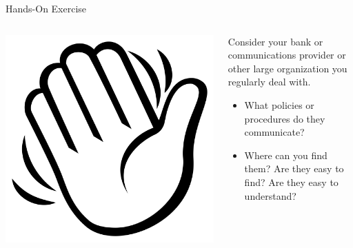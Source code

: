\documentclass[ignorenonframetext,xcolor=x11names]{beamer}
\begin{document}
\begin{frame}{Hands-On Exercise}
\begin{columns}
\begin{column}{0.2\textwidth}
\href{https://commons.wikimedia.org/wiki/File:Emojione_BW_1F44B.svg}{\includegraphics[width=\textwidth]{hand.png}}
\end{column}
\begin{column}{0.8\textwidth}

Consider your bank or communications provider or other large organization you regularly deal with. 
\begin{itemize}
  \item What policies or procedures do they communicate?
  \item Where can you find them? Are they easy to find? Are they easy to understand?
\end{itemize}
\end{column}
\end{columns}
\end{frame}
\end{document}
